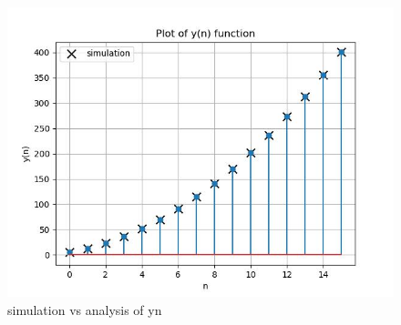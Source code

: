 \documentclass[journal,12pt,twocolumn]{IEEEtran}
\theoremstyle{remark}
\begin{document}
\begin{figure}
    \centering
    \includegraphics[width=1\columnwidth]{ncert-maths/10/5/3/5/figs/10.5.3.5.2.jpg}
    \caption{simulation vs analysis of y\brak n}
\end{figure}
\end{document}
